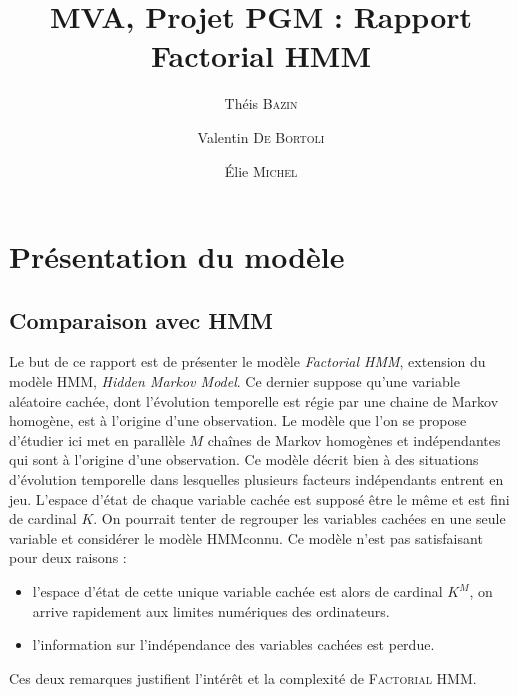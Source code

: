 \documentclass[10pt,a4paper]{article}
\title{MVA, Projet PGM : Rapport\\
  Factorial HMM}
\author{Théis \textsc{Bazin} \and Valentin \textsc{De Bortoli} \and Élie \textsc{Michel}}
\newcommand{\hmm}{\textsc{HMM}}
\newcommand{\fhmm}{\textsc{Factorial HMM}}
\begin{document}
\maketitle

\section{Présentation du modèle}
\subsection{Comparaison avec HMM}
Le but de ce rapport est de présenter le modèle \emph{Factorial HMM}, extension du modèle \hmm, \emph{Hidden Markov Model}. Ce dernier suppose qu'une variable aléatoire cachée, dont l'évolution temporelle est régie par une chaine de Markov homogène, est à l'origine d'une observation. Le modèle que l'on se propose d'étudier ici met en parallèle $M$ chaînes de Markov homogènes et indépendantes qui sont à l'origine d'une observation. Ce modèle décrit bien à des situations d'évolution temporelle dans lesquelles plusieurs facteurs indépendants entrent en jeu. L'espace d'état de chaque variable cachée est supposé être le même et est fini de cardinal $K$. On pourrait tenter de regrouper les variables cachées en une seule variable et considérer le modèle \hmm connu. Ce modèle n'est pas satisfaisant pour deux raisons :
\begin{itemize}
\item l'espace d'état de cette unique variable cachée est alors de cardinal $K^M$, on arrive rapidement aux limites numériques des ordinateurs.
\item l'information sur l'indépendance des variables cachées est perdue.
\end{itemize}
Ces deux remarques justifient l'intérêt et la complexité de \fhmm.
\end{document}
